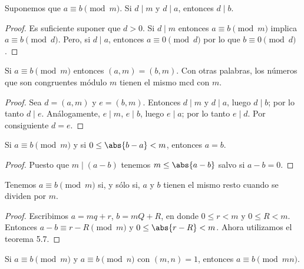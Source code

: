 \documentclass[12pt,a4paper]{book}
\begin{document}
    \begin{teorema}
        Suponemos que $a\equiv b\pmod{m}$. Si $d\mid m$ y $d\mid a$, entonces $d\mid b$.
    \end{teorema}

    \begin{proof}
        Es suficiente suponer que $d>0$. Si $d\mid m$ entonces $a\equiv b\pmod{m}$ implica
        $a\equiv b\pmod{d}$. Pero, si $d\mid a$, entonces $a\equiv0\pmod{d}$ por lo que
        $b\equiv0\pmod{d}$.
    \end{proof}

    \begin{teorema}
        Si $a\equiv b\pmod{m}$ entonces $(a,m)=(b,m)$. Con otras palabras, los números que
        son congruentes módulo $m$ tienen el mismo mcd con $m$.
    \end{teorema}

    \begin{proof}
        Sea $d=(a,m)$ y $e=(b,m)$. Entonces $d\mid m$ y $d\mid a$, luego $d\mid b$; por lo
        tanto $d\mid e$. Análogamente, $e\mid m$, $e\mid b$, luego $e\mid a$; por lo tanto
        $e\mid d$. Por consiguiente $d=e$.
    \end{proof}

    \begin{teorema}
        Si $a\equiv b\pmod{m}$ y si $0\leq\abs{b-a}<m$, entonces $a=b$.
    \end{teorema}

    \begin{proof}
        Puesto que $m\mid(a-b)$ tenemos $m\leq\abs{a-b}$ salvo si $a-b=0$.
    \end{proof}

    \begin{teorema}
        Tenemos $a\equiv b\pmod{m}$ si, y sólo si, $a$ y $b$ tienen el mismo resto cuando
        se dividen por $m$.
    \end{teorema}

    \begin{proof}
        Escribimos $a=mq+r$, $b=mQ+R$, en donde $0\leq r<m$ y $0\leq R<m$. Entonces
        $a-b\equiv r-R\pmod{m}$ y $0\leq\abs{r-R}<m$. Ahora utilizamos el teorema 5.7.
    \end{proof}

    \begin{teorema}
        Si $a\equiv b\pmod{m}$ y $a\equiv b\pmod{n}$ con $(m,n)=1$, entonces
        $a\equiv b\pmod{mn}$.
    \end{teorema}
\end{document}
